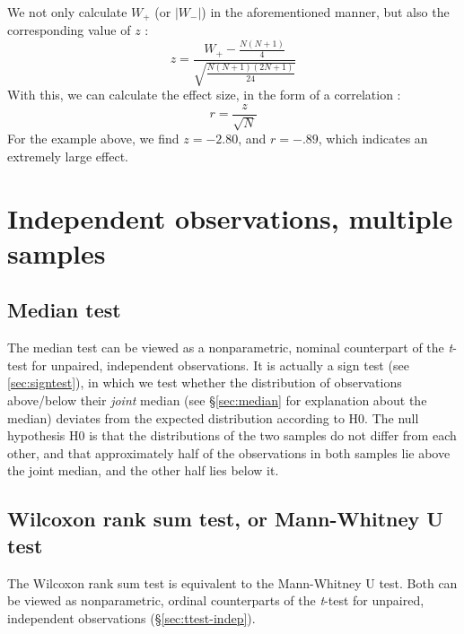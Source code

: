 \documentclass[
]{book}
\begin{document}
We not only calculate \(W_+\) (or \(|W_-|\)) in the aforementioned manner, but also
the corresponding value of \(z\) \citep{Ferg89}:
\begin{equation}
  \label{eq:Wilcoxon-signedrank-z}
  z = \frac{ W_+ - \frac{N(N+1)}{4} } { \sqrt{ \frac{N(N+1)(2N+1)}{24} } }
\end{equation}
With this, we can calculate the effect size, in the form of
a correlation \citep[ Eq.2.18]{Rose91}:
\begin{equation}
  \label{eq:es-z2r}
    r = \frac {z} {\sqrt{N}}
\end{equation}
For the example above, we find
\(z=-2.80\), and \(r=-.89\), which indicates an extremely large effect.

\hypertarget{independent-observations-multiple-samples}{%
\section{Independent observations, multiple samples}\label{independent-observations-multiple-samples}}

\hypertarget{median-test}{%
\subsection{Median test}\label{median-test}}

The median test can be viewed as a nonparametric, nominal
counterpart
of the \emph{t}-test for unpaired, independent observations. It is actually
a sign test (see \ref{sec:signtest}), in which we test whether the
distribution of observations above/below their \emph{joint} median
(see §\ref{sec:median} for explanation about the median) deviates from
the expected distribution according to H0.
The null hypothesis H0 is that the distributions of the two samples
do not differ from each other, and that approximately half of the observations
in both samples lie above the joint median, and the other half lies below
it.

\hypertarget{sec:wilcoxon-rank-sum}{%
\subsection{Wilcoxon rank sum test, or Mann-Whitney U test}\label{sec:wilcoxon-rank-sum}}

The Wilcoxon rank sum test is equivalent to the Mann-Whitney U test.
Both can be viewed as nonparametric, ordinal counterparts
of the \emph{t}-test for unpaired, independent observations
(§\ref{sec:ttest-indep}).
\end{document}

